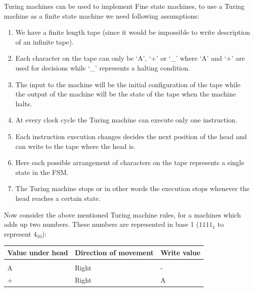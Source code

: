 \documentclass[a4paper,10pt]{article}
\theoremstyle{mytheor}
\begin{document}
{  Turing machines can be used to implement Fine state machines, to use
  a Turing machine as a finite state machine we need following
  assumptions:
  \begin{enumerate}
  \item We have a finite length tape (since it would be impossible
    to write description of an infinite tape).
  \item Each character on the tape can only be `A', `+' or `\_' where
    `A' and `+' are used for decisions while `\_' represents a
    halting condition.
  \item The input to the machine will be the initial configuration
    of the tape while the output of the machine will be the state of
    the tape when the machine halts.
  \item At every clock cycle the Turing machine can execute only one
    instruction.
  \item Each instruction execution changes decides the next position
    of the head and can write to the tape where the head is.
  \item Here each possible arrangement of characters on the tape
    represents a single state in the FSM.
  \item The Turing machine stops or in other words the execution stops
    whenever the head reaches a certain state.
  \end{enumerate}

    Now consider the above mentioned Turing machine rules, for a machines
    which adds up two numbers. These numbers are represented in base 1
    ($1111_1$ to represent $4_{10}$):
    \begin{table}
      \centering
      \renewcommand{\arraystretch}{1.1}
      \begin{tabularx}{0.8\textwidth}{|X|X|X|}
        \hline
        \rowcolor{greatblue}
        \color{white} Value under head & \color{white}Direction of movement & \color{white}Write value \\
        \hline
        \vspace{0.2cm}&&\\
        A & Right & - \\
        + & Right & A \\
        \hline
      \end{tabularx}
    \end{table}

}
\end{document}
